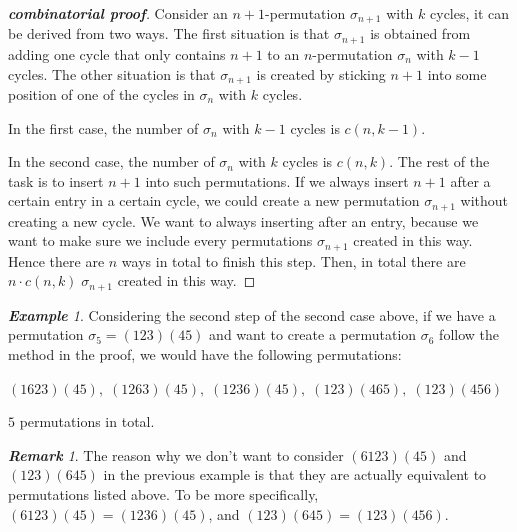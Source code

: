 \documentclass{article}
\theoremstyle{definition}
\theoremstyle{remark}
\newtheorem*{remark}{\textbf{Remark}}
\theoremstyle{example}
\newtheorem{example}{\textbf{Example}}[section]
\begin{document}
\begin{proof}[\textbf{combinatorial proof}]\label{prf:RRpf1st}
    Consider an $n+1$-permutation $\sigma_{n+1}$ with $k$ cycles, it can be derived from two ways. The first situation is that $\sigma_{n+1}$ is obtained from adding one cycle that only contains $n+1$ to an $n$-permutation $\sigma_n$ with $k-1$ cycles. The other situation is that $\sigma_{n+1}$ is created by sticking $n+1$ into some position of one of the cycles in $\sigma_n$ with $k$ cycles.
    
    In the first case, the number of $\sigma_n$ with $k-1$ cycles is $c(n,k-1)$.
    
    In the second case, the number of $\sigma_n$ with $k$ cycles is $c(n,k)$. The rest of the task is to insert $n+1$ into such permutations. If we always insert $n+1$ after a certain entry in a certain cycle, we could create a new permutation $\sigma_{n+1}$ without creating a new cycle. We want to always inserting after an entry, because we want to make sure we include every permutations $\sigma_{n+1}$ created in this way. Hence there are $n$ ways in total to finish this step. Then, in total there are $n\cdot c(n,k)\; \sigma_{n+1}$ created in this way.
\end{proof}

\begin{example}
Considering the second step of the second case above, if we have a permutation $\sigma_5 = (123)(45)$ and want to create a permutation $\sigma_6$ follow the method in the proof, we would have the following permutations:
    \begin{center}
        $(1623)(45), \; (1263)(45), \; (1236)(45), \; (123)(465), \;(123)(456)$
    \end{center}
    $5$ permutations in total. 
\end{example}

\begin{remark}
    The reason why we don't want to consider $(6123)(45)$ and $(123)(645)$ in the previous example is that they are actually equivalent to permutations listed above. To be more specifically, $(6123)(45) = (1236)(45)$, and $(123)(645) = (123)(456)$.
\end{remark}
\end{document}
